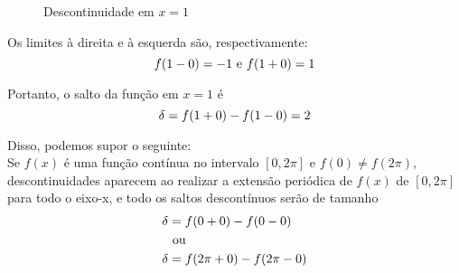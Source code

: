 \begin{figure}[H]
    \begin{center}
    \end{center}
    \caption{Descontinuidade em $x = 1$}
    \label{fig:saltoEx}
\end{figure}

Os limites à direita e à esquerda são, respectivamente:
\begin{equation}
\notag
    f(1 - 0) = -1\text{  e  }f(1 + 0) = 1
\end{equation} 

Portanto, o salto da função em $x = 1$ é
\begin{equation}
\notag
    \delta = f(1 + 0) - f(1 - 0) = 2
\end{equation} 

Disso, podemos supor o seguinte:
\\

Se $f(x)$ é uma função contínua no intervalo $[0, 2\pi]$ e $f(0) \neq f(2\pi)$,
descontinuidades aparecem ao realizar a extensão periódica de $f(x)$ de $[0, 2\pi]$
para todo o eixo-x, e todo os saltos descontínuos serão de tamanho
\begin{equation}
\notag
\begin{split}
    \delta & = f(0 + 0) - f(0 - 0)\\
    &\text{    ou}\\
    \delta & = f(2\pi + 0) - f(2\pi - 0)
\end{split}
\end{equation} 